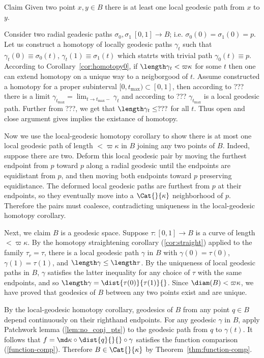 \begin{clm}{Claim}
Given two point $x,y\in B$ there is at least one local geodesic path from $x$ to $y$.
\end{clm}

Consider two radial geadesic paths $\sigma_0,\sigma_1\:[0,1]\to B$;
i.e. $\sigma_0(0)=\sigma_1(0)=p$.
Let us construct a homotopy of locally geodesic paths $\gamma_t$ such that $\gamma_t(0)\equiv\sigma_0(t)$, $\gamma_t(1)\equiv\sigma_1(t)$ which statrts with trivial path $\gamma_0(t)\equiv p$.
According to Corollary~\ref{cor:homotopy0}, if $\length\gamma_t<\varpi\kappa$ for some $t$ then one can extend homotopy on a unique way to a neigborgood of $t$. 
Assume constructed a homotopy for a proper subinterval $[0,t_{\max})\subset[0,1]$,
then according to ??? there is a limit $\gamma_{t_{\max}}=\lim_{t\to t_{\max}-}\gamma_t$ and according to ??? $\gamma_{t_{\max}}$ is a local geodesic path.
Further from ???, we get that $\length\gamma_t\le???$ for all $t$.
Thus open and close argument gives implies the existance of homotopy.




Now we use the local-geodesic homotopy corollary to show there is at most one local geodesic path of length $<\varpi\kappa$ in $B$ joining any two points of $B$.  Indeed, suppose there are two. Deform this local geodesic pair by moving the furthest endpoint from $p$ toward $p$ along a radial geodesic until the endpoints are equidistant from $p$, and then moving both endpoints toward $p$ preserving equidistance.  
The deformed local geodesic paths are furthest from $p$ at their endpoints, so they eventually move into a $\Cat{}{\kappa}$ neighborhood of $p$.  Therefore the pairs must coalesce, contradicting uniqueness in the local-geodesic homotopy corollary.

Next, we claim $B$ is a geodesic space.  Suppose $\tau:[0,1]\to B$ is a curve of length $<\varpi\kappa$. 
By the homotopy straightening corollary (\ref{cor:straight}) applied to the  family $\tau_r=\tau$, there is a local geodesic path $\gamma$ in $B$ with $\gamma(0)=\tau(0)$, $\gamma(1)=\tau(1)$, and $\length\gamma\le\length\tau$.  
By the uniqueness of local geodesic paths in $B$, $\gamma$ satisfies the latter  inequality for any choice of $\tau$ with the same endpoints, and so $\length\gamma=\dist{\tau(0)}{\tau(1)}{}$.  Since $\diam(B)<\varpi\kappa$, we have proved that geodesics of $B$ between any two points  exist and are unique.  

By the local-geodesic homotopy corollary, geodesics of $B$ from any point $q\in B$ depend continuously on their righthand endpoints. For any geodesic $\gamma$ in  $B$, apply Patchwork lemma (\ref{lem:no_conj_pts}) to the geodesic path from $q$ to $\gamma(t)$.  It follows that    $f=\md\kappa\circ \dist{q}{}{}\circ \gamma$ satisfies the function comparison (\ref{function-comp}).  
Therefore  $B\in\Cat{}{\kappa}$ by Theorem~\ref{thm:function-comp}.















